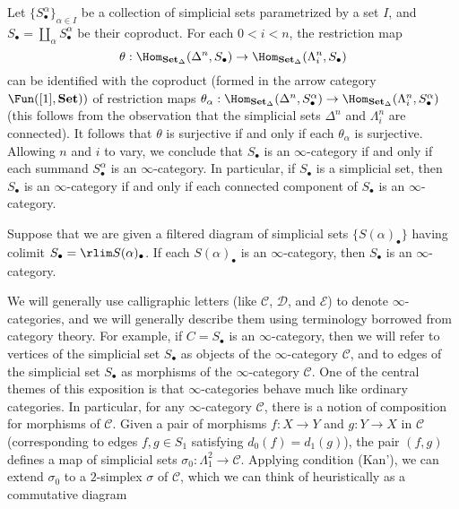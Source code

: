 \begin{example}\label{simplicial set coproduct of inf-cat}
Let $\{S_\bullet^\alpha\}_{\alpha\in I}$ be a collection of simplicial sets parametrized by a set $I$, and $S_\bullet=\coprod_{\alpha}S_\bullet^\alpha$ be their coproduct. For each $0<i<n$, the restriction map
\[\theta:\Hom_{\mathbf{Set}_\Delta}(\Delta^n,S_\bullet)\to\Hom_{\mathbf{Set}_\Delta}(\Lambda_i^n,S_\bullet)\]
can be identified with the coproduct (formed in the arrow category $\Fun([1],\mathbf{Set}))$ of restriction maps $\theta_\alpha:\Hom_{\mathbf{Set}_\Delta}(\Delta^n,S_\bullet^\alpha)\to\Hom_{\mathbf{Set}_\Delta}(\Lambda^n_i,S_\bullet^\alpha)$ (this follows from the observation that
the simplicial sets $\Delta^n$ and $\Lambda_i^n$ are connected). It follows that $\theta$ is surjective if and only if each $\theta_\alpha$ is surjective. Allowing $n$ and $i$ to vary, we conclude that $S_\bullet$ is an $\infty$-category if and only if each summand $S_\bullet^\alpha$ is an $\infty$-category. In particular, if $S_\bullet$ is a simplicial set, then $S_\bullet$ is an $\infty$-category if and only if each connected component of $S_\bullet$ is an $\infty$-category.
\end{example}
\begin{remark}
Suppose that we are given a filtered diagram of simplicial sets $\{S(\alpha)_\bullet\}$ having colimit $S_\bullet=\rlim S(\alpha)_\bullet$. If each $S(\alpha)_\bullet$ is an $\infty$-category, then $S_\bullet$ is an $\infty$-category.
\end{remark}
We will generally use calligraphic letters (like $\mathcal{C}$, $\mathcal{D}$, and $\mathcal{E}$) to denote $\infty$-categories, and we will generally describe them using terminology borrowed from category theory. For example, if $C=S_\bullet$ is an $\infty$-category, then we will refer to vertices of the simplicial set $S_\bullet$ as objects of the $\infty$-category $\mathcal{C}$, and to edges of the simplicial set $S_\bullet$ as morphisms of the $\infty$-category $\mathcal{C}$. One of the central themes of this exposition is that $\infty$-categories behave much like ordinary categories. In particular, for any $\infty$-category $\mathcal{C}$, there is a notion of composition for morphisms of $\mathcal{C}$. Given a pair of morphisms $f:X\to Y$ and $g:Y\to X$ in $\mathcal{C}$ (corresponding to edges $f,g\in S_1$ satisfying $d_0(f)=d_1(g)$), the pair $(f,g)$ defines a map of simplicial sets $\sigma_0:\Lambda^2_1\to\mathcal{C}$. Applying condition (Kan'), we can extend $\sigma_0$ to a $2$-simplex $\sigma$ of $\mathcal{C}$, which we can think of heuristically as a commutative diagram
